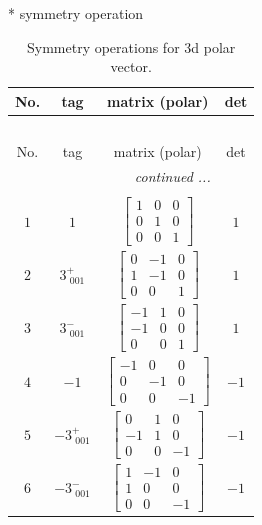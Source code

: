 \documentclass[fleqn,8pt]{jsarticle}
\begin{document}
* symmetry operation
\renewcommand{\arraystretch}{1.3}
\begin{longtable}{cccc}
\caption{Symmetry operations for 3d polar vector.}
 \\
 \hline \hline
No. & tag & matrix (polar) & det \\ \hline \endfirsthead

\multicolumn{3}{l}{\tablename\ \thetable{}} \\
 \hline \hline
No. & tag & matrix (polar) & det \\ \hline \endhead

 \hline \hline
\multicolumn{3}{r}{\footnotesize\it continued ...} \\ \endfoot

 \hline \hline
\multicolumn{3}{r}{} \\ \endlastfoot

$ 1 $ & $ 1 $ & $ \begin{bmatrix} 1 & 0 & 0 \\ 0 & 1 & 0 \\ 0 & 0 & 1 \end{bmatrix} $ & $ 1 $ \\ \hline
$ 2 $ & $ 3^{+}_{\,\,001} $ & $ \begin{bmatrix} 0 & -1 & 0 \\ 1 & -1 & 0 \\ 0 & 0 & 1 \end{bmatrix} $ & $ 1 $ \\ \hline
$ 3 $ & $ 3^{-}_{\,\,001} $ & $ \begin{bmatrix} -1 & 1 & 0 \\ -1 & 0 & 0 \\ 0 & 0 & 1 \end{bmatrix} $ & $ 1 $ \\ \hline
$ 4 $ & $ -1 $ & $ \begin{bmatrix} -1 & 0 & 0 \\ 0 & -1 & 0 \\ 0 & 0 & -1 \end{bmatrix} $ & $ -1 $ \\ \hline
$ 5 $ & $ -3^{+}_{\,\,001} $ & $ \begin{bmatrix} 0 & 1 & 0 \\ -1 & 1 & 0 \\ 0 & 0 & -1 \end{bmatrix} $ & $ -1 $ \\ \hline
$ 6 $ & $ -3^{-}_{\,\,001} $ & $ \begin{bmatrix} 1 & -1 & 0 \\ 1 & 0 & 0 \\ 0 & 0 & -1 \end{bmatrix} $ & $ -1 $ \\
\end{longtable}
\end{document}
